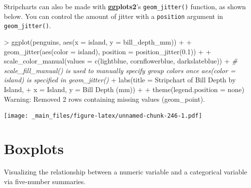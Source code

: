\documentclass[
]{book}
\newenvironment{Shaded}{\begin{snugshade}}{\end{snugshade}}
\newcommand{\AttributeTok}[1]{\textcolor[rgb]{0.77,0.63,0.00}{#1}}
\newcommand{\CommentTok}[1]{\textcolor[rgb]{0.56,0.35,0.01}{\textit{#1}}}
\newcommand{\DecValTok}[1]{\textcolor[rgb]{0.00,0.00,0.81}{#1}}
\newcommand{\FloatTok}[1]{\textcolor[rgb]{0.00,0.00,0.81}{#1}}
\newcommand{\FunctionTok}[1]{\textcolor[rgb]{0.00,0.00,0.00}{#1}}
\newcommand{\NormalTok}[1]{#1}
\newcommand{\SpecialCharTok}[1]{\textcolor[rgb]{0.00,0.00,0.00}{#1}}
\newcommand{\StringTok}[1]{\textcolor[rgb]{0.31,0.60,0.02}{#1}}
\begin{document}
Stripcharts can also be made with \textbf{ggplots2}'s \texttt{geom\_jitter()} function, as shown below. You can control the amount of jitter with a \texttt{position} argument in \texttt{geom\_jitter()}.

\begin{Shaded}
\begin{Highlighting}[]
\SpecialCharTok{\textgreater{}} \FunctionTok{ggplot}\NormalTok{(penguins, }\FunctionTok{aes}\NormalTok{(}\AttributeTok{x =}\NormalTok{ island, }\AttributeTok{y =}\NormalTok{ bill\_depth\_mm)) }\SpecialCharTok{+}
\SpecialCharTok{+}   \FunctionTok{geom\_jitter}\NormalTok{(}\FunctionTok{aes}\NormalTok{(}\AttributeTok{color =}\NormalTok{ island), }\AttributeTok{position =} \FunctionTok{position\_jitter}\NormalTok{(}\FloatTok{0.1}\NormalTok{)) }\SpecialCharTok{+}
\SpecialCharTok{+}   \FunctionTok{scale\_color\_manual}\NormalTok{(}\AttributeTok{values =} \FunctionTok{c}\NormalTok{(}\StringTok{\textquotesingle{}lightblue\textquotesingle{}}\NormalTok{, }\StringTok{\textquotesingle{}cornflowerblue\textquotesingle{}}\NormalTok{, }\StringTok{\textquotesingle{}darkslateblue\textquotesingle{}}\NormalTok{)) }\SpecialCharTok{+} \CommentTok{\# scale\_fill\_manual() is used to manually specify group colors once aes(color = island) is specified in \textasciigrave{}geom\_jitter()\textasciigrave{}}
\SpecialCharTok{+}   \FunctionTok{labs}\NormalTok{(}\AttributeTok{title =} \StringTok{\textquotesingle{}Stripchart of Bill Depth by Island\textquotesingle{}}\NormalTok{, }
\SpecialCharTok{+}        \AttributeTok{x =} \StringTok{\textquotesingle{}Island\textquotesingle{}}\NormalTok{, }\AttributeTok{y =} \StringTok{\textquotesingle{}Bill Depth (mm)\textquotesingle{}}\NormalTok{) }\SpecialCharTok{+}
\SpecialCharTok{+}   \FunctionTok{theme}\NormalTok{(}\AttributeTok{legend.position =} \StringTok{\textquotesingle{}none\textquotesingle{}}\NormalTok{)}
\NormalTok{Warning}\SpecialCharTok{:}\NormalTok{ Removed }\DecValTok{2}\NormalTok{ rows containing missing }\FunctionTok{values}\NormalTok{ (geom\_point).}
\end{Highlighting}
\end{Shaded}

\texttt{[image: \_main\_files/figure-latex/unnamed-chunk-246-1.pdf]}

\hypertarget{boxplots}{%
\section{Boxplots}\label{boxplots}}

Visualizing the relationship between a numeric variable and a categorical variable via five-number summaries.
\end{document}
